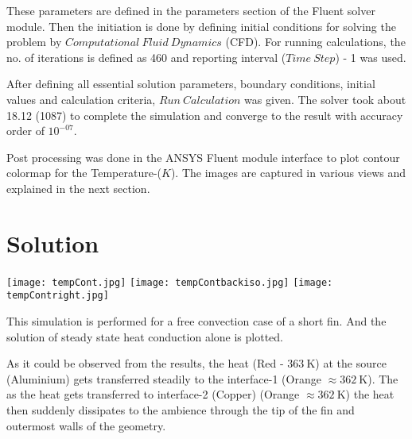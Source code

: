 \documentclass{article}
\begin{document}
\vspace{1cm}
These parameters are defined in the parameters section of the Fluent solver module. Then the initiation is done by defining initial conditions for solving the problem by $Computational\ Fluid\ Dynamics$ (CFD). For running calculations, the no. of iterations is defined as 460 and reporting interval ($Time\ Step$) - 1 was used.

After defining all essential solution parameters, boundary conditions, initial values and calculation criteria, $Run\ Calculation$ was given. The solver took about \SI{18.12}{\min} (\SI{1087}{\sec}) to complete the simulation and converge to the result with accuracy order of $10^{-07}$. 

Post processing was done in the ANSYS Fluent module interface to plot contour colormap for the Temperature-($K$). The images are captured in various views and explained in the next section.

\section{Solution}
\begin{center}
    \texttt{[image: tempCont.jpg]}
    \texttt{[image: tempContbackiso.jpg]}
    \texttt{[image: tempContright.jpg]}
\end{center}
\vspace{2cm}
This simulation is performed for a free convection case of a short fin. And the solution of steady state heat conduction alone is plotted. 

As it could be observed from the results, the heat (Red - $\SI{363}{\kelvin}$) at the source (Aluminium) gets transferred steadily to the interface-1 (Orange $\approx \SI{362}{\kelvin}$). The as the heat gets transferred to interface-2 (Copper) (Orange $\approx \SI{362}{\kelvin}$) the heat then suddenly dissipates to the ambience through the tip of the fin and outermost walls of the geometry.
\end{document}
